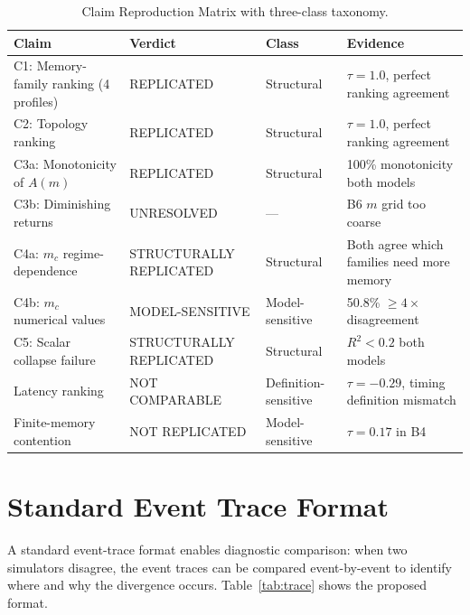\documentclass{ams-journal}
\begin{document}
\begin{table}[t]
\centering
\caption{Claim Reproduction Matrix with three-class taxonomy.}
\label{tab:claim_matrix}
\begin{tabular}{lp{3.5cm}p{2.8cm}p{3cm}}
\toprule
Claim & Verdict & Class & Evidence \\
\midrule
C1: Memory-family ranking (4 profiles) & REPLICATED & Structural & $\tau = 1.0$, perfect ranking agreement \\
C2: Topology ranking & REPLICATED & Structural & $\tau = 1.0$, perfect ranking agreement \\
C3a: Monotonicity of $A(m)$ & REPLICATED & Structural & 100\% monotonicity both models \\
C3b: Diminishing returns & UNRESOLVED & --- & B6 $m$ grid too coarse \\
C4a: $m_c$ regime-dependence & STRUCTURALLY REPLICATED & Structural & Both agree which families need more memory \\
C4b: $m_c$ numerical values & MODEL-SENSITIVE & Model-sensitive & 50.8\% $\geq 4\times$ disagreement \\
C5: Scalar collapse failure & STRUCTURALLY REPLICATED & Structural & $R^2 < 0.2$ both models \\
Latency ranking & NOT COMPARABLE & Definition-sensitive & $\tau = -0.29$, timing definition mismatch \\
Finite-memory contention & NOT REPLICATED & Model-sensitive & $\tau = 0.17$ in B4 \\
\bottomrule
\end{tabular}
\end{table}

\section{Standard Event Trace Format}
\label{app:trace}

A standard event-trace format enables diagnostic comparison: when two simulators disagree, the event traces can be compared event-by-event to identify where and why the divergence occurs. Table~\ref{tab:trace} shows the proposed format.
\end{document}
